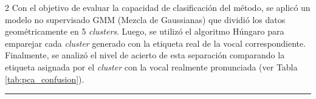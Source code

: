 \documentclass[11pt, letterpaper]{article}
\begin{document}
\begin{multicols*}{2}
Con el objetivo de evaluar la capacidad de clasificación del método, se aplicó un modelo no supervisado GMM (Mezcla de Gaussianas) que dividió los datos geométricamente en 5 \textit{clusters}. Luego, se utilizó el algoritmo Húngaro para emparejar cada \textit{cluster} generado con la etiqueta real de la vocal correspondiente. Finalmente, se analizó el nivel de acierto de esta separación comparando la etiqueta asignada por el \textit{cluster} con la vocal realmente pronunciada (ver Tabla \ref{tab:pca_confusion}).
\vspace{-4mm} %
\begin{center}
    \noindent\textcolor{gray}{\rule{0.85\linewidth}{0.1pt}} %
\end{center}
\vspace{-1mm} %
\noindent
\begin{minipage}{\columnwidth}


\end{minipage}
\end{multicols*}
\end{document}
